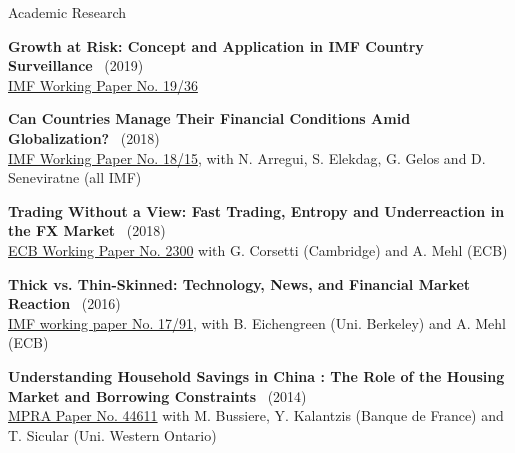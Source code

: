 \documentclass[usegeometry, 10pt, a4paper]{cv} %
\newcommand{\activite}[1]{\textbf{#1}\ }
\begin{document}
\begin{rubriquetableau}[0.95\textwidth]{Academic Research}
  
\activite{Growth at Risk: Concept and Application in IMF Country Surveillance} (2019) \\
\hspace{0.6cm} \small{\href{https://www.imf.org/en/Publications/WP/Issues/2019/02/21/Growth-at-Risk-Concept-and-Application-in-IMF-Country-Surveillance-46567}{IMF Working Paper No. 19/36}}
\vspace{0.4cm} 

\activite{Can Countries Manage Their Financial Conditions Amid Globalization?} (2018) \\
\hspace{0.6cm} \small{\href{https://www.imf.org/en/Publications/WP/Issues/2018/01/24/Can-Countries-Manage-Their-Financial-Conditions-Amid-Globalization-45581}{IMF Working Paper No. 18/15}, with N. Arregui, S. Elekdag, G. Gelos and D. Seneviratne (all IMF)}
\vspace{0.4cm} 

\activite{Trading Without a View: Fast Trading, Entropy and Underreaction in the FX  Market} (2018) \\
\hspace{0.6cm}
\small{\href{https://www.ecb.europa.eu/pub/pdf/scpwps/ecb.wp2300~68bda93b78.en.pdf}{ECB
    Working Paper No. 2300} with G. Corsetti (Cambridge) and A. Mehl (ECB)}
\vspace{0.4cm} 

\activite{Thick vs. Thin-Skinned: Technology, News, and Financial Market Reaction} (2016) \\
\hspace{0.6cm} \small{\href{https://www.imf.org/en/Publications/WP/Issues/2017/04/07/Thick-vs-44810}{IMF working paper No. 17/91}, with B. Eichengreen (Uni. Berkeley) and A. Mehl (ECB)}
\vspace{0.4cm} 

    
\activite{Understanding Household Savings in China : The Role of the Housing Market and Borrowing Constraints} (2014)  \\
\hspace{0.6cm}
\small{\href{https://ideas.repec.org/p/pra/mprapa/44611.html}{MPRA Paper
    No. 44611} with M. Bussiere, Y. Kalantzis (Banque de France) and T. Sicular (Uni. Western Ontario)}
\end{rubriquetableau}

\vspace{0.8cm}
\end{document}
